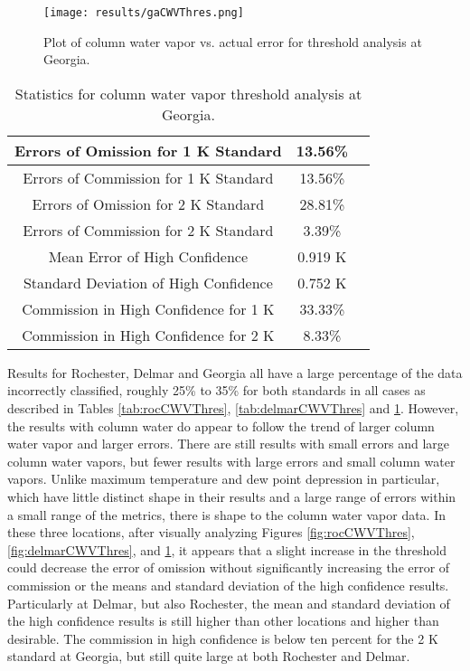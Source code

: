 \documentclass{book}
\begin{document}
\begin{minipage}[c]{0.47\textwidth}
\centering
\begin{figure}[H]
\texttt{[image: results/gaCWVThres.png]}
\caption{Plot of column water vapor vs. actual error for threshold analysis at Georgia.}
\label{fig:gaCWVThres}
\end{figure}
\end{minipage}
\begin{minipage}[c]{0.47\textwidth}
\begin{table}[H]
\centering
\footnotesize
\begin{tabular}{ | c | c | c | } \hline
Errors of Omission for 1 K Standard & 13.56\% \\ \hline
Errors of Commission for 1 K Standard & 13.56\% \\ \hline
Errors of Omission for 2 K Standard & 28.81\% \\ \hline
Errors of Commission for 2 K Standard & 3.39\% \\ \hline
Mean Error of High Confidence & 0.919 K \\ \hline
Standard Deviation of High Confidence & 0.752 K \\ \hline
Commission in High Confidence for 1 K & 33.33\% \\ \hline
Commission in High Confidence for 2 K & 8.33\% \\ \hline
\end{tabular}
\caption{Statistics for column water vapor threshold analysis at Georgia.}
\label{tab:gaCWVThres}
\end{table}
\end{minipage}

Results for Rochester, Delmar and Georgia all have a large percentage of the data incorrectly classified, roughly 25\% to 35\% for both standards in all cases as described in Tables \ref{tab:rocCWVThres}, \ref{tab:delmarCWVThres} and \ref{tab:gaCWVThres}.  However, the results with column water do appear to follow the trend of larger column water vapor and larger errors.  There are still results with small errors and large column water vapors, but fewer results with large errors and small column water vapors.  Unlike maximum temperature and dew point depression in particular, which have little distinct shape in their results and a large range of errors within a small range of the metrics, there is shape to the column water vapor data.  In these three locations, after visually analyzing Figures \ref{fig:rocCWVThres}, \ref{fig:delmarCWVThres}, and \ref{fig:gaCWVThres}, it appears that a slight increase in the threshold could decrease the error of omission without significantly increasing the error of commission or the means and standard deviation of the high confidence results.  Particularly at Delmar, but also Rochester, the mean and standard deviation of the high confidence results is still higher than other locations and higher than desirable.  The commission in high confidence is below ten percent for the 2 K standard at Georgia, but still quite large at both Rochester and Delmar.
\end{document}
